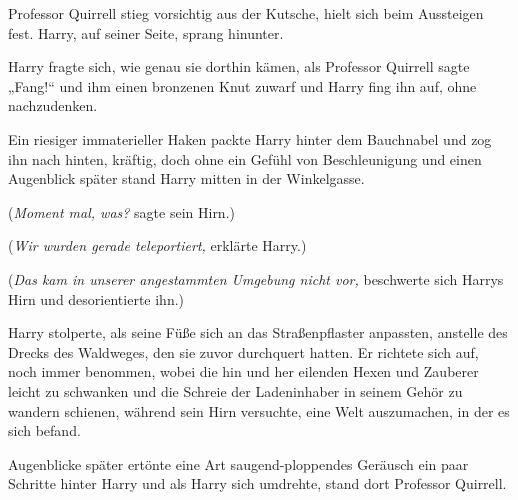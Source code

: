 Professor Quirrell stieg vorsichtig aus der Kutsche, hielt sich beim Aussteigen fest. Harry, auf seiner Seite, sprang hinunter.

Harry fragte sich, wie genau sie dorthin kämen, als Professor Quirrell sagte
„Fang!“ und ihm einen bronzenen Knut zuwarf und Harry fing ihn auf, ohne nachzudenken.

Ein riesiger immaterieller Haken packte Harry hinter dem Bauchnabel und zog ihn nach hinten, kräftig, doch ohne ein Gefühl von Beschleunigung und einen Augenblick später stand Harry mitten in der Winkelgasse.

(\emph{Moment mal, was?} sagte sein Hirn.)

(\emph{Wir wurden gerade teleportiert,} erklärte Harry.)

(\emph{Das kam in unserer angestammten Umgebung nicht vor,} beschwerte sich Harrys Hirn und desorientierte ihn.)

Harry stolperte, als seine Füße sich an das Straßenpflaster anpassten, anstelle des Drecks des Waldweges, den sie zuvor durchquert hatten. Er richtete sich auf, noch immer benommen, wobei die hin und her eilenden Hexen und Zauberer leicht zu schwanken und die Schreie der Ladeninhaber in seinem Gehör zu wandern schienen, während sein Hirn versuchte, eine Welt auszumachen, in der es sich befand.

Augenblicke später ertönte eine Art saugend-ploppendes Geräusch ein paar Schritte hinter Harry und als Harry sich umdrehte, stand dort Professor Quirrell.

